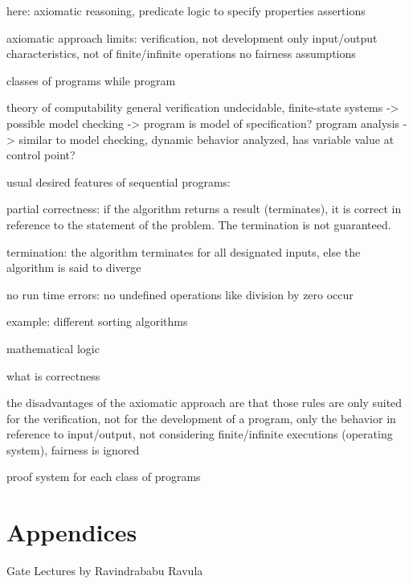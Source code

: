 here: axiomatic reasoning, predicate logic to specify properties
assertions

axiomatic approach limits:
verification, not development
only input/output characteristics, not of finite/infinite operations
no fairness assumptions


classes of programs
while program

theory of computability general verification undecidable, finite-state systems -> possible
model checking -> program is model of specification?
program analysis -> similar to model checking, dynamic behavior analyzed, has variable value at control point?




usual desired features of sequential programs:

partial correctness: if the algorithm returns a result (terminates),
it is correct in reference to the statement of the problem. The termination
is not guaranteed.

termination: the algorithm terminates for all designated inputs, else
the algorithm is said to diverge

no run time errors: no undefined operations like division by zero
occur

example: different sorting algorithms

mathematical logic

what is correctness

the disadvantages of the axiomatic approach are that those rules are
only suited for the verification, not for the development of a program,
only the behavior in reference to input/output, not considering finite/infinite
executions (operating system), fairness is ignored

proof system for each class of programs

\textemdash{}

\textemdash{}

\newpage{}

\chapter*{Appendices}

Gate Lectures by Ravindrababu Ravula

\clearpage
{}

